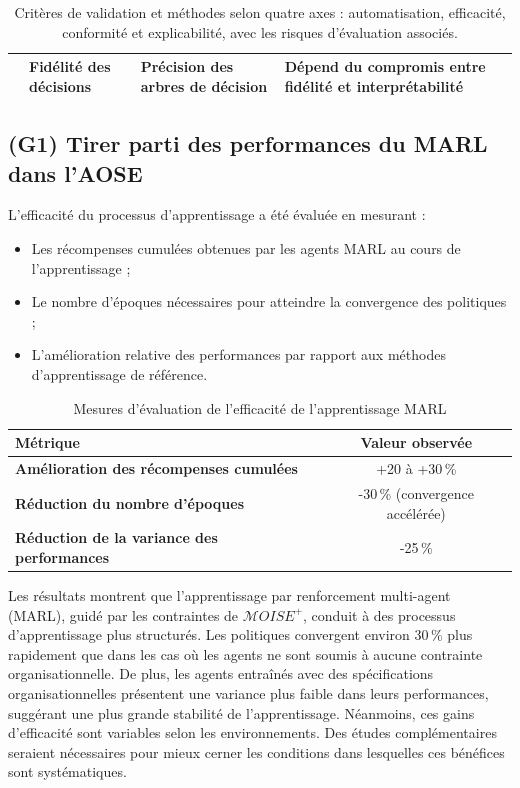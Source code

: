 \documentclass[pdflatex,sn-mathphys-num]{sn-jnl}%
\theoremstyle{thmstyleone}%
\theoremstyle{thmstyletwo}%
\theoremstyle{thmstylethree}%
\begin{document}
\begin{table}[h!]
\begin{footnotesize}
\begin{tabular}{p{1.5cm}p{2.4cm}p{2.2cm}p{4.5cm}}
                               & Fidélité des décisions   & Précision des arbres de décision & Dépend du compromis entre fidélité et interprétabilité \\
            \hline
        \end{tabular}
        \caption{Critères de validation et méthodes selon quatre axes : automatisation, efficacité, conformité et explicabilité, avec les risques d'évaluation associés.}
        \label{tab:validation_strategy}
    \end{footnotesize}
\end{table}

\subsection{(G1) Tirer parti des performances du MARL dans l'AOSE}

L'efficacité du processus d'apprentissage a été évaluée en mesurant :
\begin{itemize}
    \item Les récompenses cumulées obtenues par les agents MARL au cours de l'apprentissage ;
    \item Le nombre d'époques nécessaires pour atteindre la convergence des politiques ;
    \item L'amélioration relative des performances par rapport aux méthodes d'apprentissage de référence.
\end{itemize}

\begin{table}[h!]
    \centering
    \caption{Mesures d'évaluation de l'efficacité de l'apprentissage MARL}
    \begin{tabular}{lc}
        \hline
        \textbf{Métrique}                           & \textbf{Valeur observée}       \\
        \hline
        \textbf{Amélioration des récompenses cumulées} & +20 à +30\,\%                   \\
        \hline
        \textbf{Réduction du nombre d'époques}         & -30\,\% (convergence accélérée) \\
        \hline
        \textbf{Réduction de la variance des performances} & -25\,\%                          \\
        \hline
    \end{tabular}
    \label{tab:efficiency}
\end{table}

Les résultats montrent que l'apprentissage par renforcement multi-agent (MARL), guidé par les contraintes de $\mathcal{M}OISE^+$, conduit à des processus d'apprentissage plus structurés. Les politiques convergent environ 30\,\% plus rapidement que dans les cas où les agents ne sont soumis à aucune contrainte organisationnelle. De plus, les agents entraînés avec des spécifications organisationnelles présentent une variance plus faible dans leurs performances, suggérant une plus grande stabilité de l'apprentissage. Néanmoins, ces gains d'efficacité sont variables selon les environnements. Des études complémentaires seraient nécessaires pour mieux cerner les conditions dans lesquelles ces bénéfices sont systématiques.
\end{document}
